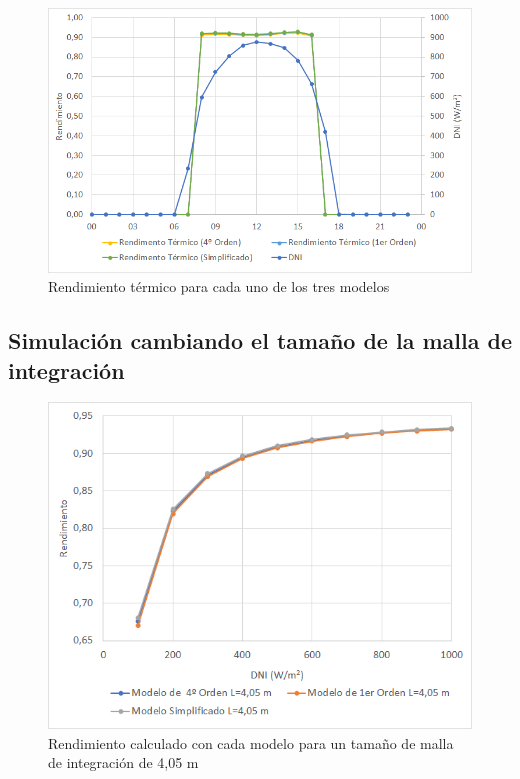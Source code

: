 \begin{figure}[h!]
\includegraphics[width=0.9\linewidth]{images/rendimientos_modelos.png}
\caption{Rendimiento térmico para cada uno de los tres modelos} 
\label{fig:rendimientos_modelos}
\end{figure}

\subsection{Simulación cambiando el tamaño de la malla de integración}
\label{mallaintegracion}


\begin{figure}[h!]
\includegraphics[width=0.9\linewidth]{images/malla0405.png}
\caption{Rendimiento calculado con cada modelo para un tamaño de malla de integración de 4,05 m} 
\label{fig:malla0405}
\end{figure}

